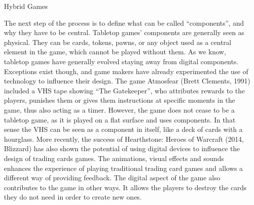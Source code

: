 Hybrid Games

The next step of the process is to define what can be called “components”, and why they have to be central. Tabletop games’ components are generally seen as physical. They can be cards, tokens, pawns, or any object used as a central element in the game, which cannot be played without them.  As we know, tabletop games have generally evolved staying away from digital components. Exceptions exist though, and game makers have already experimented the use of technology to influence their design. The game Atmosfear (Brett Clements, 1991) included a VHS tape showing “The Gatekeeper”, who attributes rewards to the players, punishes them or gives them instructions at specific moments in the game, thus also acting as a timer. However, the game does not cease to be a tabletop game, as it is played on a flat surface and uses components. In that sense the VHS can be seen as a component in itself, like a deck of cards with a hourglass. 
More recently, the success of Hearthstone: Heroes of Warcraft (2014, Blizzard) has also shown the potential of using digital devices to influence the design of trading cards games. The animations, visual effects and sounds enhances the experience of playing traditional trading card games and allows a different way of providing feedback. The digital aspect of the game also contributes to the game in other ways. It allows the players to destroy the cards they do not need in order to create new ones.
